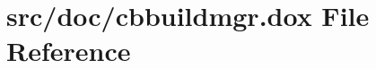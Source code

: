 \hypertarget{cbbuildmgr_8dox}{\section{src/doc/cbbuildmgr.dox File Reference}
\label{cbbuildmgr_8dox}
}
